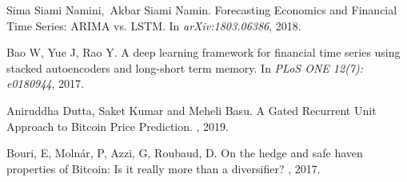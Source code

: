 \documentclass{article}
\begin{document}
  


\begin{thebibliography}{1}

Sima Siami Namini, Akbar Siami Namin.
\newblock Forecasting Economics and Financial Time Series: ARIMA vs. LSTM. 
\newblock In {\em 	arXiv:1803.06386}, 2018.

Bao W, Yue J, Rao Y.
\newblock A deep learning framework for financial time series using stacked autoencoders and long-short term memory.
\newblock In {\em PLoS ONE 12(7): e0180944}, 2017.

Aniruddha Dutta, Saket Kumar and Meheli Basu.
\newblock A Gated Recurrent Unit Approach to Bitcoin Price Prediction. 
, 2019.

Bouri, E, Molnár, P, Azzi, G, Roubaud, D.
\newblock On the hedge and safe haven properties of Bitcoin: Is it really more than a diversifier?
, 2017.

\end{thebibliography}
\end{document}

